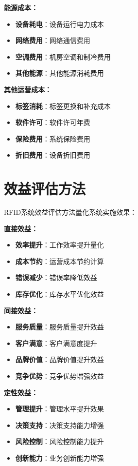 \documentclass[12pt,UTF8]{ctexbook}
\begin{document}
\begin{itemize}[leftmargin=3.5em]
\begin{itemize}[leftmargin=3.5em]
\begin{itemize}[leftmargin=3.5em]
\begin{itemize}[leftmargin=3.5em]
\textbf{能源成本：}
\begin{itemize}[leftmargin=3.5em]
    \item \textbf{设备耗电}：设备运行电力成本
    \item \textbf{网络费用}：网络通信费用
    \item \textbf{空调费用}：机房空调和制冷费用
    \item \textbf{其他能源}：其他能源消耗费用
\end{itemize}

\textbf{其他运营成本：}
\begin{itemize}[leftmargin=3.5em]
    \item \textbf{标签消耗}：标签更换和补充成本
    \item \textbf{软件许可}：软件许可年费
    \item \textbf{保险费用}：系统保险费用
    \item \textbf{折旧费用}：设备折旧费用
\end{itemize}

\section{效益评估方法}

RFID系统效益评估方法量化系统实施效果：

\textbf{直接效益：}
\begin{itemize}[leftmargin=3.5em]
    \item \textbf{效率提升}：工作效率提升量化
    \item \textbf{成本节约}：运营成本节约计算
    \item \textbf{错误减少}：错误率降低效益
    \item \textbf{库存优化}：库存水平优化效益
\end{itemize}

\textbf{间接效益：}
\begin{itemize}[leftmargin=3.5em]
    \item \textbf{服务质量}：服务质量提升效益
    \item \textbf{客户满意}：客户满意度提升
    \item \textbf{品牌价值}：品牌价值提升效益
    \item \textbf{竞争优势}：竞争优势增强效益
\end{itemize}

\textbf{定性效益：}
\begin{itemize}[leftmargin=3.5em]
    \item \textbf{管理提升}：管理水平提升效果
    \item \textbf{决策支持}：决策支持能力增强
    \item \textbf{风险控制}：风险控制能力提升
    \item \textbf{创新能力}：业务创新能力增强
\end{itemize}


\end{itemize}
\end{itemize}
\end{itemize}
\end{itemize}
\end{document}
